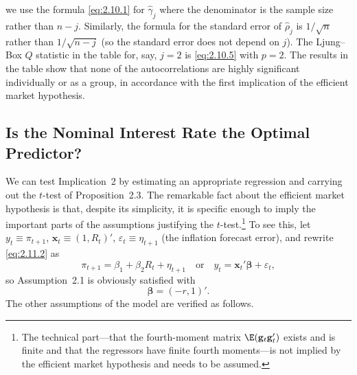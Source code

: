 \noindent
we use the formula \eqref{eq:2.10.1} for $\hat{\gamma}_j$ where the denominator is the sample size rather
than $n - j$. Similarly, the formula for the standard error of $\hat{\rho}_j$ is $1/\sqrt{n}$ rather
than $1/\sqrt{n-j}$ (so the standard error does not depend on $j$). The Ljung--Box $Q$ statistic
in the table for, say, $j = 2$ is \eqref{eq:2.10.5} with $p = 2$. The results in the table show
that none of the autocorrelations are highly significant individually or as a group,
in accordance with the first implication of the efficient market hypothesis.

\subsection*{Is the Nominal Interest Rate the Optimal Predictor?}

We can test Implication~2 by estimating an appropriate regression and carrying
out the $t$-test of Proposition~2.3. The remarkable fact about the efficient market
hypothesis is that, despite its simplicity, it is specific enough to imply the important
parts of the assumptions justifying the $t$-test.\footnote{The technical
part---that the fourth-moment matrix $\E(\mathbf{g}_t\mathbf{g}_t')$ exists and is finite and that the
regressors have finite fourth moments---is not implied by the efficient market hypothesis
and needs to be assumed.}
To see this, let $y_t \equiv \pi_{t+1}$,
$\mathbf{x}_t \equiv (1, R_t)'$, $\varepsilon_t \equiv \eta_{t+1}$ (the inflation forecast error), and rewrite
\eqref{eq:2.11.2} as
%
\begin{equation}
\pi_{t+1} = \beta_1 + \beta_2 R_t + \eta_{t+1}
\quad \text{or} \quad
y_t = \mathbf{x}_t'\bm{\beta} + \varepsilon_t,
\label{eq:2.11.4}
\end{equation}
%
so Assumption~2.1 is obviously satisfied with
%
\begin{equation}
\bm{\beta} = (-r, 1)'.
\label{eq:2.11.5}
\end{equation}
%
The other assumptions of the model are verified as follows.

